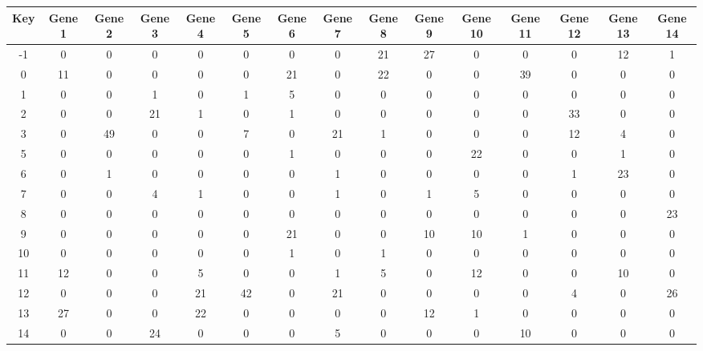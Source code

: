 \begin{tabular}{|c|c|c|c|c|c|c|c|c|c|c|c|c|c|c|}
\hline
Key & Gene 1 & Gene 2 & Gene 3 & Gene 4 & Gene 5 & Gene 6 & Gene 7 & Gene 8 & Gene 9 & Gene 10 & Gene 11 & Gene 12 & Gene 13 & Gene 14 \\
\hline
-1 & 0 & 0 & 0 & 0 & 0 & 0 & 0 & 21 & 27 & 0 & 0 & 0 & 12 & 1 \\
0 & 11 & 0 & 0 & 0 & 0 & 21 & 0 & 22 & 0 & 0 & 39 & 0 & 0 & 0 \\
1 & 0 & 0 & 1 & 0 & 1 & 5 & 0 & 0 & 0 & 0 & 0 & 0 & 0 & 0 \\
2 & 0 & 0 & 21 & 1 & 0 & 1 & 0 & 0 & 0 & 0 & 0 & 33 & 0 & 0 \\
3 & 0 & 49 & 0 & 0 & 7 & 0 & 21 & 1 & 0 & 0 & 0 & 12 & 4 & 0 \\
5 & 0 & 0 & 0 & 0 & 0 & 1 & 0 & 0 & 0 & 22 & 0 & 0 & 1 & 0 \\
6 & 0 & 1 & 0 & 0 & 0 & 0 & 1 & 0 & 0 & 0 & 0 & 1 & 23 & 0 \\
7 & 0 & 0 & 4 & 1 & 0 & 0 & 1 & 0 & 1 & 5 & 0 & 0 & 0 & 0 \\
8 & 0 & 0 & 0 & 0 & 0 & 0 & 0 & 0 & 0 & 0 & 0 & 0 & 0 & 23 \\
9 & 0 & 0 & 0 & 0 & 0 & 21 & 0 & 0 & 10 & 10 & 1 & 0 & 0 & 0 \\
10 & 0 & 0 & 0 & 0 & 0 & 1 & 0 & 1 & 0 & 0 & 0 & 0 & 0 & 0 \\
11 & 12 & 0 & 0 & 5 & 0 & 0 & 1 & 5 & 0 & 12 & 0 & 0 & 10 & 0 \\
12 & 0 & 0 & 0 & 21 & 42 & 0 & 21 & 0 & 0 & 0 & 0 & 4 & 0 & 26 \\
13 & 27 & 0 & 0 & 22 & 0 & 0 & 0 & 0 & 12 & 1 & 0 & 0 & 0 & 0 \\
14 & 0 & 0 & 24 & 0 & 0 & 0 & 5 & 0 & 0 & 0 & 10 & 0 & 0 & 0 \\
\hline
\end{tabular}
